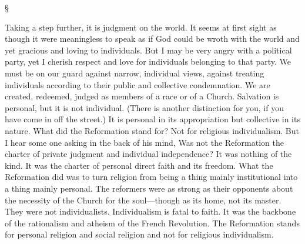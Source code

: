 \documentclass[12pt,a5paper,twoside,titlepage]{book}
\begin{document}
\begin{center}
\S
\end{center}

Taking a step further, it is judgment on the 
world. It seems at first sight as though it 
were meaningless to speak as if God could be 
wroth with the world and yet gracious and 
loving to individuals. But I may be very angry 
with a political party, yet I cherish respect and 
love for individuals belonging to that party. 
We must be on our guard against narrow, individual 
views, against treating individuals according 
to their public and collective condemnation. 
We are created, redeemed, judged as members 
of a race or of a Church. Salvation is personal, 
but it is not individual. (There is another distinction for you, if you have come in off the 
street.) It is personal in its appropriation but 
collective in its nature. What did the Reformation stand for? Not for religious individualism. 
But I hear some one asking in the back of his 
mind, Was not the Reformation the charter of 
private judgment and individual independence? 
It was nothing of the kind. It was the charter 
of personal direct faith and its freedom. What 
the Reformation did was to turn religion from 
being a thing mainly institutional into a thing 
mainly personal. The reformers were as strong 
as their opponents about the necessity of the 
Church for the soul---though as its home, not its 
master. They were not individualists. Individualism 
is fatal to faith. It was the backbone 
of the rationalism and atheism of the French 
Revolution. The Reformation stands for personal 
religion and social religion and not for 
religious individualism. 
\end{document}
